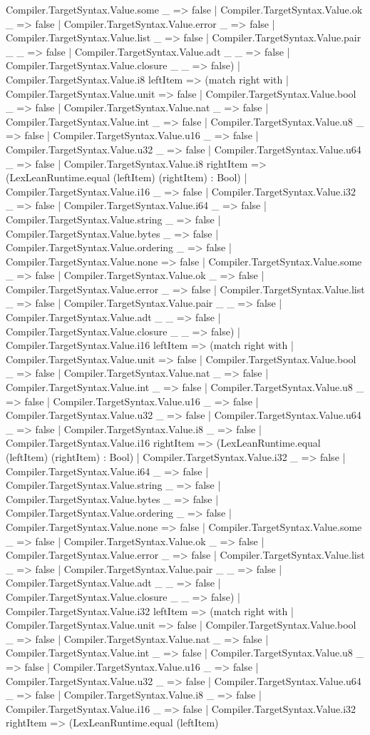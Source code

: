 \documentclass[11pt]{article}
\begin{document}
Compiler.TargetSyntax.Value.some \_ => false | Compiler.TargetSyntax.Value.ok \_ => false | Compiler.TargetSyntax.Value.error \_ => false | Compiler.TargetSyntax.Value.list \_ => false | Compiler.TargetSyntax.Value.pair \_ \_ => false | Compiler.TargetSyntax.Value.adt \_ \_ => false | Compiler.TargetSyntax.Value.closure \_ \_ => false) | Compiler.TargetSyntax.Value.i8 leftItem => (match right with | Compiler.TargetSyntax.Value.unit => false | Compiler.TargetSyntax.Value.bool \_ => false | Compiler.TargetSyntax.Value.nat \_ => false | Compiler.TargetSyntax.Value.int \_ => false | Compiler.TargetSyntax.Value.u8 \_ => false | Compiler.TargetSyntax.Value.u16 \_ => false | Compiler.TargetSyntax.Value.u32 \_ => false | Compiler.TargetSyntax.Value.u64 \_ => false | Compiler.TargetSyntax.Value.i8 rightItem => (LexLeanRuntime.equal (leftItem) (rightItem) : Bool) | Compiler.TargetSyntax.Value.i16 \_ => false | Compiler.TargetSyntax.Value.i32 \_ => false | Compiler.TargetSyntax.Value.i64 \_ => false | Compiler.TargetSyntax.Value.string \_ => false | Compiler.TargetSyntax.Value.bytes \_ => false | Compiler.TargetSyntax.Value.ordering \_ => false | Compiler.TargetSyntax.Value.none => false | Compiler.TargetSyntax.Value.some \_ => false | Compiler.TargetSyntax.Value.ok \_ => false | Compiler.TargetSyntax.Value.error \_ => false | Compiler.TargetSyntax.Value.list \_ => false | Compiler.TargetSyntax.Value.pair \_ \_ => false | Compiler.TargetSyntax.Value.adt \_ \_ => false | Compiler.TargetSyntax.Value.closure \_ \_ => false) | Compiler.TargetSyntax.Value.i16 leftItem => (match right with | Compiler.TargetSyntax.Value.unit => false | Compiler.TargetSyntax.Value.bool \_ => false | Compiler.TargetSyntax.Value.nat \_ => false | Compiler.TargetSyntax.Value.int \_ => false | Compiler.TargetSyntax.Value.u8 \_ => false | Compiler.TargetSyntax.Value.u16 \_ => false | Compiler.TargetSyntax.Value.u32 \_ => false | Compiler.TargetSyntax.Value.u64 \_ => false | Compiler.TargetSyntax.Value.i8 \_ => false | Compiler.TargetSyntax.Value.i16 rightItem => (LexLeanRuntime.equal (leftItem) (rightItem) : Bool) | Compiler.TargetSyntax.Value.i32 \_ => false | Compiler.TargetSyntax.Value.i64 \_ => false | Compiler.TargetSyntax.Value.string \_ => false | Compiler.TargetSyntax.Value.bytes \_ => false | Compiler.TargetSyntax.Value.ordering \_ => false | Compiler.TargetSyntax.Value.none => false | Compiler.TargetSyntax.Value.some \_ => false | Compiler.TargetSyntax.Value.ok \_ => false | Compiler.TargetSyntax.Value.error \_ => false | Compiler.TargetSyntax.Value.list \_ => false | Compiler.TargetSyntax.Value.pair \_ \_ => false | Compiler.TargetSyntax.Value.adt \_ \_ => false | Compiler.TargetSyntax.Value.closure \_ \_ => false) | Compiler.TargetSyntax.Value.i32 leftItem => (match right with | Compiler.TargetSyntax.Value.unit => false | Compiler.TargetSyntax.Value.bool \_ => false | Compiler.TargetSyntax.Value.nat \_ => false | Compiler.TargetSyntax.Value.int \_ => false | Compiler.TargetSyntax.Value.u8 \_ => false | Compiler.TargetSyntax.Value.u16 \_ => false | Compiler.TargetSyntax.Value.u32 \_ => false | Compiler.TargetSyntax.Value.u64 \_ => false | Compiler.TargetSyntax.Value.i8 \_ => false | Compiler.TargetSyntax.Value.i16 \_ => false | Compiler.TargetSyntax.Value.i32 rightItem => (LexLeanRuntime.equal (leftItem) 
\end{document}
